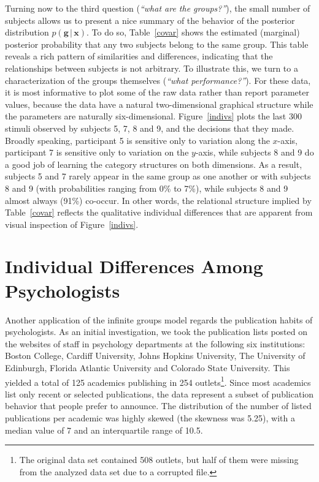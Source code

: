 \documentclass[authoryear]{elsarticle}
\newcommand{\condon}{\,|\,}
\newcommand{\vctr}[1]{\bm{#1}}
\begin{document}
Turning now to the third question  ({\it ``what are the groups?''}), the
small number of subjects allows us to present a nice summary of
the behavior of the posterior distribution $p(\vctr{g} \condon \vctr{x})$.
To do so,
Table~\ref{covar} shows the estimated (marginal) posterior probability
that any two subjects belong to the same group. This table reveals a
rich pattern of similarities and differences, indicating that the relationships
between subjects is not arbitrary. To illustrate this, we
turn to a characterization of the groups
themselves ({\it ``what performance?''}). For these data, it is most
informative to plot some of the raw data rather than report parameter
values, because the data have a natural two-dimensional graphical
structure while the parameters are naturally six-dimensional.
Figure~\ref{indivs} plots the last 300 stimuli observed by subjects
5, 7, 8 and 9, and the decisions that they made. Broadly speaking,
participant 5 is sensitive only to variation along the $x$-axis, participant
7 is sensitive only to variation on the $y$-axis, while subjects 8 and
9 do a good job of learning the category structures on both dimensions.
As a result, subjects 5 and 7 rarely appear in the same group as one
another or with subjects 8 and 9 (with probabilities ranging from 0\%
to 7\%), while subjects 8 and 9 almost always (91\%) co-occur.
In other words, the relational structure implied by Table~\ref{covar}
reflects the qualitative individual differences that are apparent from
visual inspection of Figure~\ref{indivs}.

\section{Individual Differences Among Psychologists}

Another application of the infinite groups model regards the publication
habits of psychologists. As an initial investigation, we took the publication
lists posted on the websites of staff in psychology departments at the
following six institutions: Boston College, Cardiff University, Johns Hopkins
University, The University of Edinburgh, Florida Atlantic University
and Colorado State University. This yielded a total of 125 academics
publishing in 254  outlets\footnote{The original data set contained 508
outlets, but half of them were missing from the analyzed data set due to a
corrupted file.}. Since most academics list only recent or selected publications,
the data represent a subset of publication behavior that people prefer to
announce. The distribution of the number of listed publications per
academic was highly skewed (the skewness was 5.25), with a median value
of 7 and an interquartile range of 10.5.
\end{document}
